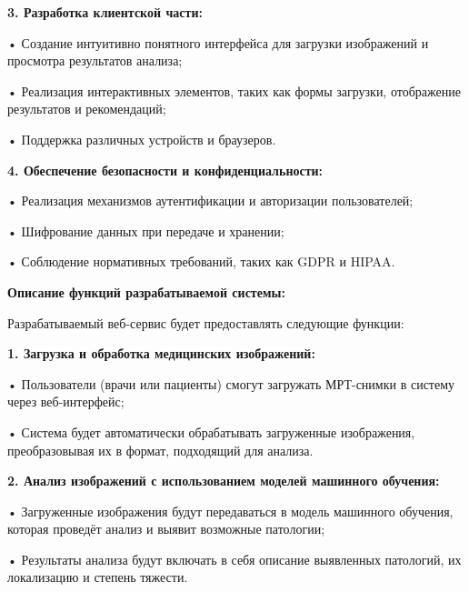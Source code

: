 {  \par \redline \textbf{3. Разработка клиентской части:}
  \par \redline \hspace{0.3cm} • Создание интуитивно понятного интерфейса для загрузки изображений и просмотра результатов анализа;
  \par \redline \hspace{0.3cm} • Реализация интерактивных элементов, таких как формы загрузки, отображение результатов и рекомендаций;
  \par \redline \hspace{0.3cm} • Поддержка различных устройств и браузеров.

  \par \redline \textbf{4. Обеспечение безопасности и конфиденциальности:}
  \par \redline \hspace{0.3cm} • Реализация механизмов аутентификации и авторизации пользователей;
  \par \redline \hspace{0.3cm} • Шифрование данных при передаче и хранении;
  \par \redline \hspace{0.3cm} • Соблюдение нормативных требований, таких как GDPR и HIPAA.

  \par \redline \textbf{Описание функций разрабатываемой системы:}
  \par \redline Разрабатываемый веб-сервис будет предоставлять следующие функции:

  \par \redline \textbf{1. Загрузка и обработка медицинских изображений:}
  \par \redline \hspace{0.3cm} • Пользователи (врачи или пациенты) смогут загружать МРТ-снимки в систему через веб-интерфейс;
  \par \redline \hspace{0.3cm} • Система будет автоматически обрабатывать загруженные изображения, преобразовывая их в формат, подходящий для анализа.

  \par \redline \textbf{2. Анализ изображений с использованием моделей машинного обучения:}
  \par \redline \hspace{0.3cm} • Загруженные изображения будут передаваться в модель машинного обучения, которая проведёт анализ и выявит возможные патологии;
  \par \redline \hspace{0.3cm} • Результаты анализа будут включать в себя описание выявленных патологий, их локализацию и степень тяжести.

}
